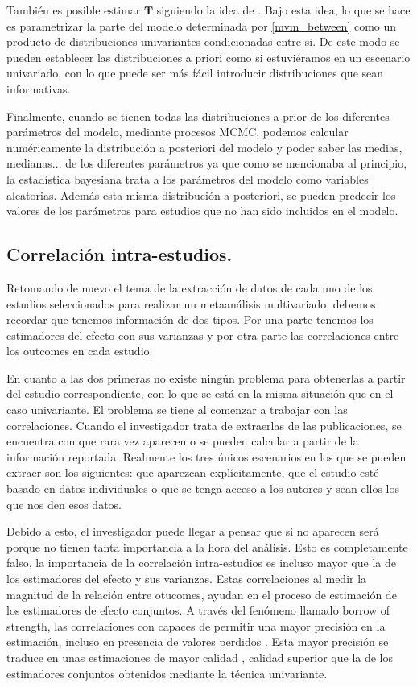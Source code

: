 \documentclass[a4paper,openright,12pt]{report}
\begin{document}
También es posible estimar $\mathbf{T}$ siguiendo la idea de \cite{Bujkiewicz2013}. Bajo esta idea, lo que se hace es parametrizar la parte del modelo determinada por \ref{mvm_between} como un producto de distribuciones univariantes condicionadas entre si. De este modo se pueden establecer las distribuciones a priori como si estuviéramos en un escenario univariado, con lo que puede ser más fácil introducir distribuciones que sean informativas.

Finalmente, cuando se tienen todas las distribuciones a prior de los diferentes parámetros del modelo, mediante procesos MCMC, podemos calcular numéricamente la distribución a posteriori del modelo y poder saber las medias, medianas... de los diferentes parámetros ya que como se mencionaba al principio, la estadística bayesiana trata a los parámetros del modelo como variables aleatorias. Además esta misma distribución a posteriori, se pueden predecir los valores de los parámetros para estudios que no han sido incluidos en el modelo.
\newpage

\subsection{Correlación intra-estudios.}

Retomando de nuevo el tema de la extracción de datos de cada uno de los estudios seleccionados para realizar un metaanálisis multivariado, debemos recordar que tenemos información de dos tipos. Por una parte tenemos los estimadores del efecto con sus varianzas y por otra parte las correlaciones entre los outcomes en cada estudio.

En cuanto a las dos primeras no existe ningún problema para obtenerlas a partir del estudio correspondiente, con lo que se está en la misma situación que en el caso univariante. El problema se tiene al comenzar a trabajar con las correlaciones. Cuando el investigador trata de extraerlas de las publicaciones, se encuentra con que rara vez aparecen o se pueden calcular a partir de la información reportada. Realmente los tres únicos escenarios en los que se pueden extraer son los siguientes: que aparezcan explícitamente, que el estudio esté basado en datos individuales o que se tenga acceso a los autores y sean ellos los que nos den esos datos.

Debido a esto, el investigador puede llegar a pensar que si no aparecen será porque no tienen tanta importancia a la hora del análisis. Esto es completamente falso, la importancia de la correlación intra-estudios es incluso mayor que la de los estimadores del efecto y sus varianzas. Estas correlaciones al medir la magnitud de la relación entre otucomes, ayudan en el proceso de estimación de los estimadores de efecto conjuntos. A través del fenómeno llamado borrow of strength, las correlaciones con capaces de permitir una mayor precisión en la estimación, incluso en presencia de valores perdidos \cite{Higgins1996}. Esta mayor precisión se traduce en unas estimaciones de mayor calidad \cite{Nam2003}\cite{Mavridis2011}\cite{Riley2007}\cite{Jackson2011}, calidad superior que la de los estimadores conjuntos obtenidos mediante la técnica univariante.
\end{document}
